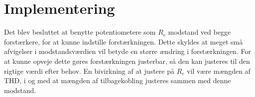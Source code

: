 \section{Implementering}
Det blev besluttet at benytte potentiometere som $R_e$ modstand ved begge forstærkere, for at kunne indstille forstærkningen. Dette skyldes at meget små afvigelser i modstandsværdien vil betyde en større ændring i forstærkningen. For at kunne opveje dette gøres forstærkningen justerbar, så den kan justeres til den rigtige værdi efter behov. En bivirkning af at justere på $R_e$ vil være mængden af THD, i og med at mængden af tilbagekobling justeres sammen med denne modstand.